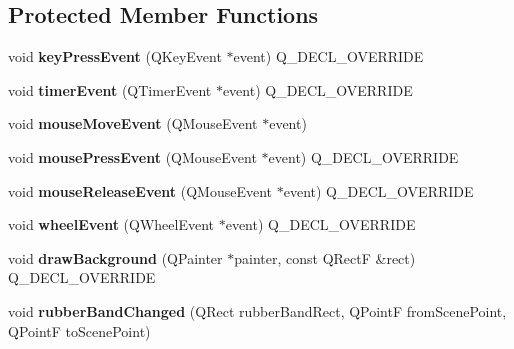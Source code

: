 \subsection*{Protected Member Functions}
\begin{DoxyCompactItemize}
\item 
\mbox{\label{class_graph_widget_aec782f01795f0b6720cc5e5fa2ff332f}} 
void {\bfseries key\+Press\+Event} (Q\+Key\+Event $\ast$event) Q\+\_\+\+D\+E\+C\+L\+\_\+\+O\+V\+E\+R\+R\+I\+DE
\item 
\mbox{\label{class_graph_widget_ac0f376b61b13fd270dc4837c8df93abb}} 
void {\bfseries timer\+Event} (Q\+Timer\+Event $\ast$event) Q\+\_\+\+D\+E\+C\+L\+\_\+\+O\+V\+E\+R\+R\+I\+DE
\item 
\mbox{\label{class_graph_widget_a828c433b131cf77048592b62ba179de0}} 
void {\bfseries mouse\+Move\+Event} (Q\+Mouse\+Event $\ast$event)
\item 
\mbox{\label{class_graph_widget_affa04e91a793579fa277c956bb4683db}} 
void {\bfseries mouse\+Press\+Event} (Q\+Mouse\+Event $\ast$event) Q\+\_\+\+D\+E\+C\+L\+\_\+\+O\+V\+E\+R\+R\+I\+DE
\item 
\mbox{\label{class_graph_widget_a13c186f835c9ce9d7f5ad1d7bfd64418}} 
void {\bfseries mouse\+Release\+Event} (Q\+Mouse\+Event $\ast$event) Q\+\_\+\+D\+E\+C\+L\+\_\+\+O\+V\+E\+R\+R\+I\+DE
\item 
\mbox{\label{class_graph_widget_ae1a7340213221478e1697f168c2e3054}} 
void {\bfseries wheel\+Event} (Q\+Wheel\+Event $\ast$event) Q\+\_\+\+D\+E\+C\+L\+\_\+\+O\+V\+E\+R\+R\+I\+DE
\item 
\mbox{\label{class_graph_widget_a5502df84f36544e050252e2b3a446dc6}} 
void {\bfseries draw\+Background} (Q\+Painter $\ast$painter, const Q\+RectF \&rect) Q\+\_\+\+D\+E\+C\+L\+\_\+\+O\+V\+E\+R\+R\+I\+DE
\item 
\mbox{\label{class_graph_widget_a79f3a2349429d58c614f65f690c19dfc}} 
void {\bfseries rubber\+Band\+Changed} (Q\+Rect rubber\+Band\+Rect, Q\+PointF from\+Scene\+Point, Q\+PointF to\+Scene\+Point)
\end{DoxyCompactItemize}


